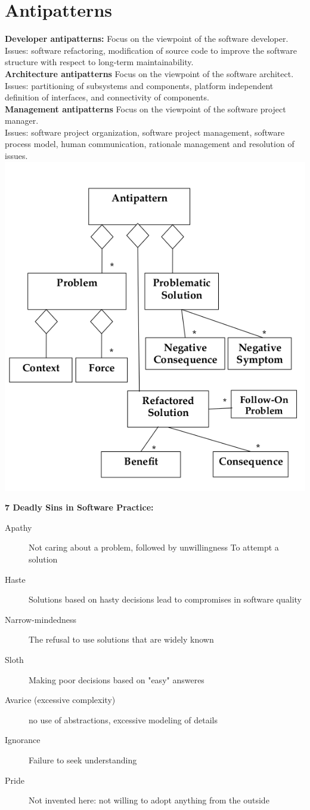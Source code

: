
\section{Antipatterns}
\textbf{Developer antipatterns:}
Focus on the viewpoint of the software developer.\\
Issues: software refactoring, modification of source code to
improve the software structure with respect to long-term
maintainability.\\
\textbf{Architecture antipatterns}
Focus on the viewpoint of the software architect.\\
Issues: partitioning of subsystems and components, platform
independent definition of interfaces, and connectivity of
components.\\
\textbf{Management antipatterns}
Focus on the viewpoint of the software project manager.\\
Issues: software project organization, software project
management, software process model, human communication,
rationale management and resolution of issues.\\

\includegraphics[width=.5\linewidth]{images/antipattern.png}

\textbf{7 Deadly Sins in Software Practice:}
\begin{description}
  \item[Apathy] Not caring about a problem, followed by unwillingness To attempt a solution
  \item[Haste] Solutions based on hasty decisions lead to compromises in software quality
  \item[Narrow-mindedness] The refusal to use solutions that are widely known
  \item[Sloth] Making poor decisions based on "easy" answeres
  \item[Avarice (excessive complexity)] no use of abstractions, excessive modeling of details
  \item[Ignorance] Failure to seek understanding
  \item[Pride] Not invented here: not willing to adopt anything from the outside
\end{description}
\newpage

